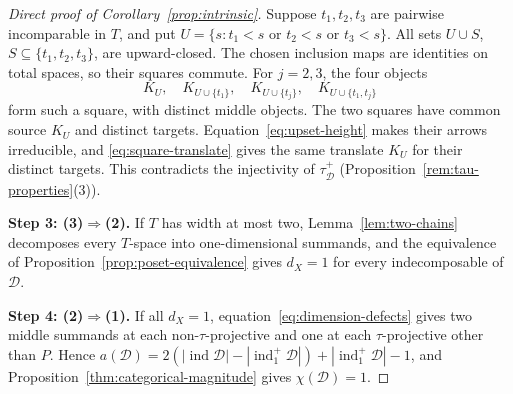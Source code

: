 \documentclass[a4paper,reqno,10pt]{amsart}
\theoremstyle{definition}
\numberwithin{equation}{section}
\DeclareMathOperator{\ind}{ind}
\newcommand{\cD}{\mathcal D}
\begin{document}
\begin{proof}[Direct proof of Corollary~\ref{prop:intrinsic}]
Suppose \(t_1,t_2,t_3\) are pairwise incomparable in \(T\), and put
\(U=\{s:t_1<s\text{ or }t_2<s\text{ or }t_3<s\}\).
All sets \(U\cup S\), \(S\subseteq\{t_1,t_2,t_3\}\), are upward-closed.
The chosen inclusion maps are identities on total spaces, so their squares
commute. For \(j=2,3\), the four objects
\[
 K_U,\quad K_{U\cup\{t_1\}},\quad K_{U\cup\{t_j\}},\quad
 K_{U\cup\{t_1,t_j\}}
\]
form such a square, with distinct middle objects. The two squares have
common source \(K_U\) and distinct targets.
Equation~\eqref{eq:upset-height} makes their arrows irreducible, and
\eqref{eq:square-translate} gives the same translate \(K_U\) for their
distinct targets. This contradicts the injectivity of \(\tau_{\cD}^+\)
(Proposition~\ref{rem:tau-properties}(3)).

\textbf{Step 3: (3)\(\Rightarrow\)(2).}
If \(T\) has width at most two, Lemma~\ref{lem:two-chains} decomposes
every \(T\)-space into one-dimensional summands, and the equivalence of
Proposition~\ref{prop:poset-equivalence} gives \(d_X=1\) for every
indecomposable of \(\cD\).

\textbf{Step 4: (2)\(\Rightarrow\)(1).}
If all \(d_X=1\), equation~\eqref{eq:dimension-defects}
gives two middle summands at each non-\(\tau\)-projective and one at
each \(\tau\)-projective other than \(P\). Hence
\(a(\cD)=2(|\ind\cD|-|\ind_1^+\cD|)+|\ind_1^+\cD|-1\), and
Proposition~\ref{thm:categorical-magnitude} gives \(\chi(\cD)=1\).
\end{proof}
\end{document}
